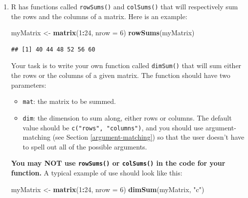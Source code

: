 \documentclass[]{book}
\makeatletter
\newenvironment{Shaded}{\begin{snugshade}}{\end{snugshade}}
\newcommand{\KeywordTok}[1]{\textcolor[rgb]{0.13,0.29,0.53}{\textbf{#1}}}
\newcommand{\DataTypeTok}[1]{\textcolor[rgb]{0.13,0.29,0.53}{#1}}
\newcommand{\DecValTok}[1]{\textcolor[rgb]{0.00,0.00,0.81}{#1}}
\newcommand{\StringTok}[1]{\textcolor[rgb]{0.31,0.60,0.02}{#1}}
\newcommand{\OperatorTok}[1]{\textcolor[rgb]{0.81,0.36,0.00}{\textbf{#1}}}
\newcommand{\NormalTok}[1]{#1}
\providecommand{\tightlist}{%
  \setlength{\itemsep}{0pt}\setlength{\parskip}{0pt}}
\newenvironment{kframe}{%
\medskip{}
\setlength{\fboxsep}{.8em}
 \def\at@end@of@kframe{}%
 \ifinner\ifhmode%
  \def\at@end@of@kframe{\end{minipage}}%
  \begin{minipage}{\columnwidth}%
 \fi\fi%
 \def\FrameCommand##1{\hskip\@totalleftmargin \hskip-\fboxsep
 \colorbox{shadecolor}{##1}\hskip-\fboxsep
     \hskip-\linewidth \hskip-\@totalleftmargin \hskip\columnwidth}%
 \MakeFramed {\advance\hsize-\width
   \@totalleftmargin\z@ \linewidth\hsize
   \@setminipage}}%
 {\par\unskip\endMakeFramed%
 \at@end@of@kframe}
\renewenvironment{Shaded}{\begin{kframe}}{\end{kframe}}
\theoremstyle{definition}
\theoremstyle{definition}
\theoremstyle{definition}
\theoremstyle{remark}
\makeatother
\begin{document}
{\begin{enumerate}
  Write your own function called \texttt{transpose()} that will perform
  the same task on any given matrix. The function should take a single
  parameter called \texttt{mat}, the matrix to be transposed. \textbf{Of
  course you may NOT use \texttt{t()} in the code for your function!}
\item
  R has functions called \texttt{rowSums()} and \texttt{colSums()} that
  will respectively sum the rows and the columns of a matrix. Here is an
  example:

\begin{Shaded}
\begin{Highlighting}[]
\NormalTok{myMatrix <-}\StringTok{ }\KeywordTok{matrix}\NormalTok{(}\DecValTok{1}\OperatorTok{:}\DecValTok{24}\NormalTok{, }\DataTypeTok{nrow =} \DecValTok{6}\NormalTok{)}
\KeywordTok{rowSums}\NormalTok{(myMatrix)}
\end{Highlighting}
\end{Shaded}

\begin{verbatim}
## [1] 40 44 48 52 56 60
\end{verbatim}

  Your task is to write your own function called \texttt{dimSum()} that
  will sum either the rows or the columns of a given matrix. The
  function should have two parameters:

  \begin{itemize}
  \tightlist
  \item
    \texttt{mat}: the matrix to be summed.
  \item
    \texttt{dim}: the dimension to sum along, either rows or columns.
    The default value should be \texttt{c("rows",\ "columns")}, and you
    should use argument-matching (see Section \ref{argument-matching})
    so that the user doesn't have to spell out all of the possible
    arguments.
  \end{itemize}

  \textbf{You may NOT use \texttt{rowSums()} or \texttt{colSums()} in
  the code for your function.} A typical example of use should look like
  this:

\begin{Shaded}
\begin{Highlighting}[]
\NormalTok{myMatrix <-}\StringTok{ }\KeywordTok{matrix}\NormalTok{(}\DecValTok{1}\OperatorTok{:}\DecValTok{24}\NormalTok{, }\DataTypeTok{nrow =} \DecValTok{6}\NormalTok{)}
\KeywordTok{dimSum}\NormalTok{(myMatrix, }\StringTok{"c"}\NormalTok{)}
\end{Highlighting}
\end{Shaded}


\end{enumerate}}
\end{document}
